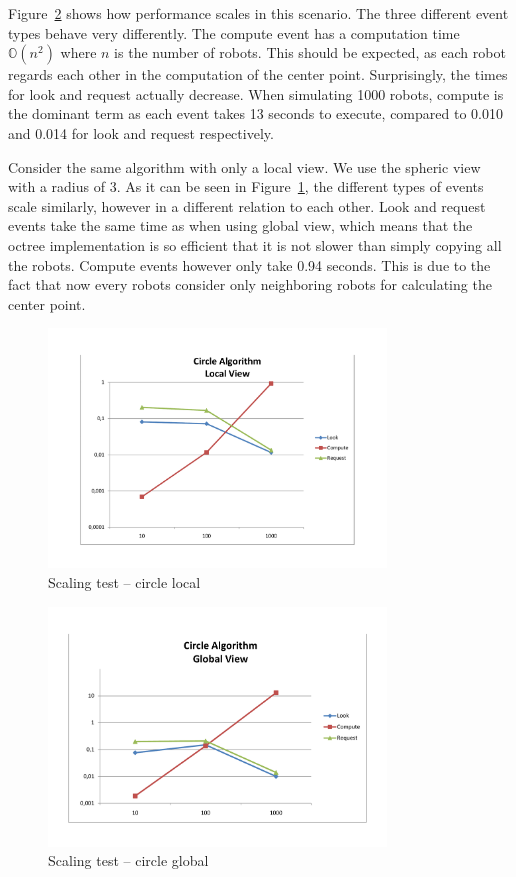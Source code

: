 Figure~\ref{pic:scaling:circleglobal} shows how performance scales in this scenario. The three different event types behave very differently. The compute event has a computation time $\mathbb{O}(n^2)$ where $n$ is the number of robots. This should be expected, as each robot regards each other in the computation of the center point. Surprisingly, the times for look and request actually decrease. When simulating 1000 robots, compute is the dominant term as each event takes 13 seconds to execute, compared to 0.010 and 0.014 for look and request respectively.

Consider the same algorithm with only a local view. We use the spheric view with a radius of 3. As it can be seen in Figure~\ref{pic:scaling:circlelocal}, the different types of events scale similarly, however in a different relation to each other. Look and request events take the same time as when using global view, which means that the octree implementation is so efficient that it is not slower than simply copying all the robots. Compute events however only take 0.94 seconds. This is due to the fact that now every robots consider only neighboring robots for calculating the center point.

\begin{figure}[p]
	\begin{center}
	\includegraphics[width=0.8\textwidth]{scaling-circle-local}
	\caption{Scaling test -- circle local}
	\label{pic:scaling:circlelocal}
	\end{center}
\end{figure}

\begin{figure}[p]
	\begin{center}
	\includegraphics[width=0.8\textwidth]{scaling-circle-global}
	\caption{Scaling test -- circle global}
	\label{pic:scaling:circleglobal}
	\end{center}
\end{figure}
